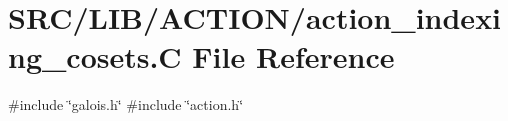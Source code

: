 \hypertarget{action__indexing__cosets_8_c}{}\section{S\+R\+C/\+L\+I\+B/\+A\+C\+T\+I\+O\+N/action\+\_\+indexing\+\_\+cosets.C File Reference}
\label{action__indexing__cosets_8_c}
{\ttfamily \#include \char`\"{}galois.\+h\char`\"{}}\newline
{\ttfamily \#include \char`\"{}action.\+h\char`\"{}}\newline
